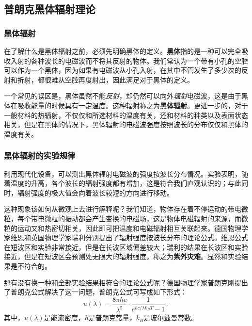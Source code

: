 
\begin{issues}
\issueTODO
\end{issues}


\subsection{普朗克黑体辐射理论}
\subsubsection{黑体辐射}
在了解什么是黑体辐射之前，必须先明确黑体的定义。\textbf{黑体}指的是一种可以完全吸收入射的各种波长的电磁波而不将其反射的物体。我们常认为一个带有小孔的空腔可以作为一个黑体，因为如果有电磁波从小孔入射，在其中不管发生了多少次的反射和折射，都很难从空腔再度射出，因此满足对于黑体的定义。

一个常见的误区是，黑体虽然不能\textsl{反射}，却仍然可以向外\textsl{辐射}电磁波，这是由于黑体在吸收能量的时候具有一定温度。这种辐射称之为\textbf{黑体辐射}。更进一步的，对于一般材料的热辐射，不仅仅和所选材料的温度有关，还和材料的种类以及表面状态相关，但是在黑体的情况下，黑体辐射的电磁波强度按照波长的分布仅仅和黑体的温度有关。

\subsubsection{黑体辐射的实验规律}
利用现代化设备，可以测出黑体辐射电磁波的强度按波长分布情况。实验表明，随着温度的升高，各个波长的辐射强度都有增加，这是符合我们直观认识的；与此同时，辐射强度的极大值会向着波长较短的方向进行移动。

这种现象该如何从微观上去进行解释呢？我们知道，物体存在着不停运动的带电微粒，每个带电微粒的振动都会产生变换的电磁场，这是物体电磁辐射的来源，而微粒的运动又和热密切相关，因此即可把温度和电磁辐射相互关联起来。德国物理学家维恩和英国物理学家瑞利分别提出了辐射强度按波长分布的理论公式。维恩公式在短波区和实验非常接近，但是在长波区域偏差较大；瑞利的结果在长波区和实验接近，但是在短波区会预测处无限大的辐射强度，称之为\textbf{紫外灾难}。显然和实验结果是不符合的。

那有没有换一种和全部实验结果相符合的理论公式呢？德国物理学家普朗克刚提出了普朗克公式解决了这一问题，普朗克公式可写成如下形式：
$$u(\lambda)=\dfrac{8\pi hc}{\lambda^5}\cdot\dfrac{1}{e^{hc/\lambda k_BT}-1}~.$$其中，$u(\lambda)$是能流密度，$h$是普朗克常量，$k_B$是玻尔兹曼常数。

